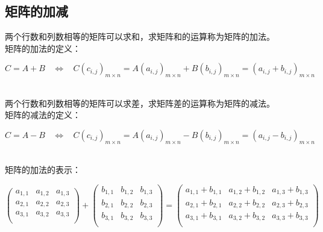 \documentclass[UTF8]{ctexart}
\begin{document}
\subsection{矩阵的加减}
    两个行数和列数相等的矩阵可以求和，求矩阵和的运算称为矩阵的加法。\\[3mm]
    矩阵的加法的定义：
    \begin{large}
        \begin{equation*}
            C=A+B~~~~\Longleftrightarrow~~~~C(c_{i,j})_{m\times n}=A(a_{i,j})_{m\times n}+B(b_{i,j})_{m\times n}=(a_{i,j}+b_{i,j})_{m\times n}
        \end{equation*}
    \end{large}\\
    两个行数和列数相等的矩阵可以求差，求矩阵差的运算称为矩阵的减法。\\[3mm]
    矩阵的减法的定义：
    \begin{large}
        \begin{equation*}
            C=A-B~~~~\Longleftrightarrow~~~~C(c_{i,j})_{m\times n}=A(a_{i,j})_{m\times n}-B(b_{i,j})_{m\times n}=(a_{i,j}-b_{i,j})_{m\times n}
        \end{equation*}
    \end{large}\\
    矩阵的加法的表示：\vspace{5pt}
    \begin{large}
        \begin{equation*}     
            \begin{pmatrix}
                a_{1,1}&a_{1,2}&a_{1,3}\\
                a_{2,1}&a_{2,2}&a_{2,3}\\
                a_{3,1}&a_{3,2}&a_{3,3}\\
            \end{pmatrix}
            +
            \begin{pmatrix}
                b_{1,1}&b_{1,2}&b_{1,3}\\
                b_{2,1}&b_{2,2}&b_{2,3}\\
                b_{3,1}&b_{3,2}&b_{3,3}\\
            \end{pmatrix}
            =
            \begin{pmatrix}
                a_{1,1}+b_{1,1}&a_{1,2}+b_{1,2}&a_{1,3}+b_{1,3}\\
                a_{2,1}+b_{2,1}&a_{2,2}+b_{2,2}&a_{2,3}+b_{2,3}\\
                a_{3,1}+b_{3,1}&a_{3,2}+b_{3,2}&a_{3,3}+b_{3,3}\\
            \end{pmatrix}
        \end{equation*}
    \end{large}\\[5mm]
\end{document}
